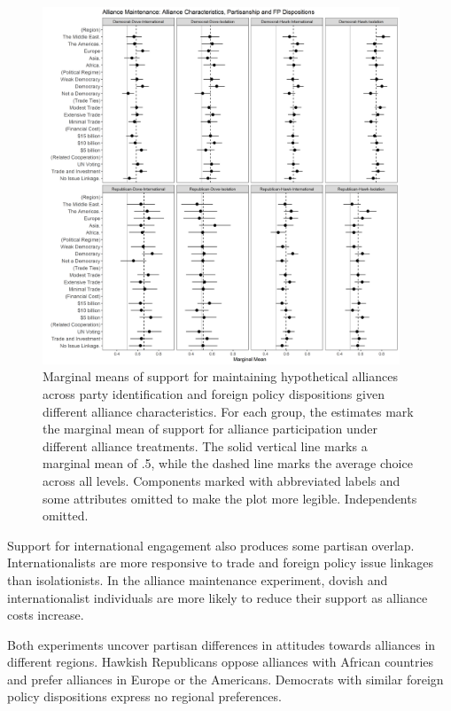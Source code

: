 \documentclass[12pt]{article}
\begin{document}
\begin{figure}
	\centering
		\includegraphics[width=0.95\textwidth]{party-dispo-main-char.png}
	\caption{Marginal means of support for maintaining hypothetical alliances across party identification and foreign policy dispositions given different alliance characteristics. For each group, the estimates mark the marginal mean of support for alliance participation under different alliance treatments. The solid vertical line marks a marginal mean of .5, while the dashed line marks the average choice across all levels. Components marked with abbreviated labels and some attributes omitted to make the plot more legible. Independents omitted.}
	\label{fig:party-dispo-main-char}
\end{figure}


Support for international engagement also produces some partisan overlap. 
Internationalists are more responsive to trade and foreign policy issue linkages than isolationists. 
In the alliance maintenance experiment, dovish and internationalist individuals are more likely to reduce their support as alliance costs increase.


Both experiments uncover partisan differences in attitudes towards alliances in different regions. 
Hawkish Republicans oppose alliances with African countries and prefer alliances in Europe or the Americans. 
Democrats with similar foreign policy dispositions express no regional preferences.  
\end{document}
